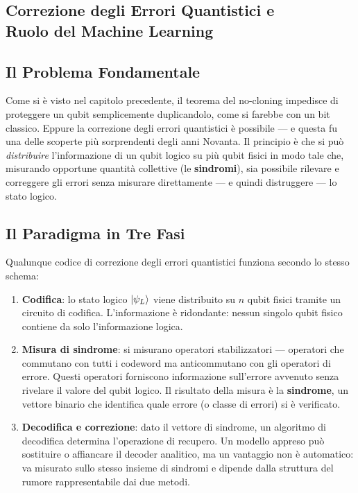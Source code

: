 \begin{onehalfspace}
\section[Correzione degli Errori Quantistici e Ruolo del Machine Learning]{Correzione degli Errori Quantistici e \\ Ruolo del Machine Learning}
\label{sec:qec_overview}

\subsection{Il Problema Fondamentale}

Come si è visto nel capitolo precedente, il teorema del no-cloning impedisce di proteggere un qubit semplicemente duplicandolo, come si farebbe con un bit classico. Eppure la correzione degli errori quantistici è possibile --- e questa fu una delle scoperte più sorprendenti degli anni Novanta. Il principio è che si può \textit{distribuire} l'informazione di un qubit logico su più qubit fisici in modo tale che, misurando opportune quantità collettive (le \textbf{sindromi}), sia possibile rilevare e correggere gli errori senza misurare direttamente --- e quindi distruggere --- lo stato logico.

\subsection{Il Paradigma in Tre Fasi}

Qualunque codice di correzione degli errori quantistici funziona secondo lo stesso schema:

\begin{enumerate}
    \item \textbf{Codifica}: lo stato logico $\ket{\psi_L}$ viene distribuito su $n$ qubit fisici tramite un circuito di codifica. L'informazione è ridondante: nessun singolo qubit fisico contiene da solo l'informazione logica.

    \item \textbf{Misura di sindrome}: si misurano operatori stabilizzatori --- operatori che commutano con tutti i codeword ma anticommutano con gli operatori di errore. Questi operatori forniscono informazione sull'errore avvenuto senza rivelare il valore del qubit logico. Il risultato della misura è la \textbf{sindrome}, un vettore binario che identifica quale errore (o classe di errori) si è verificato.

    \item \textbf{Decodifica e correzione}: dato il vettore di sindrome, un algoritmo di decodifica determina l'operazione di recupero. Un modello appreso può sostituire o affiancare il decoder analitico, ma un vantaggio non è automatico: va misurato sullo stesso insieme di sindromi e dipende dalla struttura del rumore rappresentabile dai due metodi.
\end{enumerate}
\clearpage


\end{onehalfspace}

